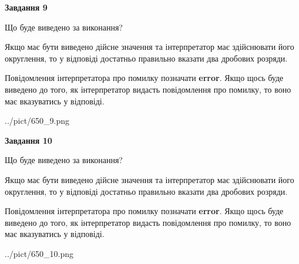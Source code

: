 \documentclass[12pt, ukrainian]{article}
\begin{document}
{\begin {Large}
{\begin {center}\textbf{Завдання 9}\end {center}}\par
Що буде виведено за виконання? \par

Якщо має бути виведено дійсне значення та інтерпретатор має здійснювати його округлення, 
то у відповіді достатньо правильно вказати два дробових розряди.

Повідомлення інтерпретатора про помилку позначати \textbf{error}.
Якщо щось буде виведено до того, як інтерпретатор видасть повідомлення про помилку, 
то воно має вказуватись у відповіді. \par

\begin{center}
	{../pict/650_9.png}
\end{center}
\newpage

{\begin {center}\textbf{Завдання 10}\end {center}}\par
Що буде виведено за виконання? \par

Якщо має бути виведено дійсне значення та інтерпретатор має здійснювати його округлення, 
то у відповіді достатньо правильно вказати два дробових розряди.

Повідомлення інтерпретатора про помилку позначати \textbf{error}.
Якщо щось буде виведено до того, як інтерпретатор видасть повідомлення про помилку, 
то воно має вказуватись у відповіді. \par

\begin{center}
	{../pict/650_10.png}
\end{center}
\newpage

\end {Large}}
\end{document}
